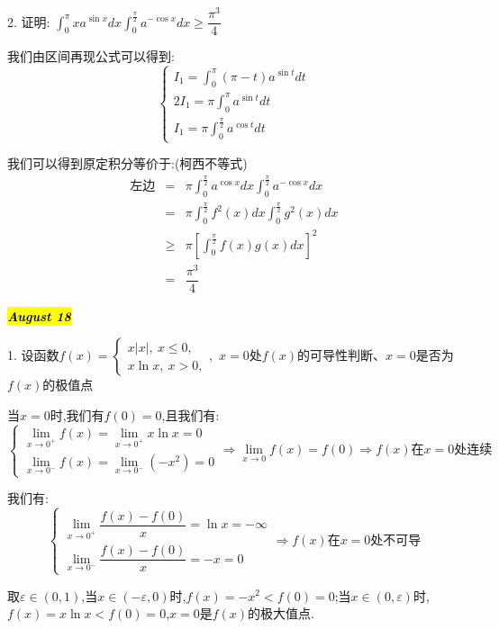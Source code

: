 2. 证明:  $\int_{0}^{\pi}xa^{\sin x}dx\int_{0}^{\frac{\pi}{2}}a^{-\cos x}dx\geq \dfrac{\pi^3}{4}$
\begin{solution}

	我们由区间再现公式可以得到:
	$$\left\lbrace 
	\begin{array}{l}
		I_{1}=\int_{0}^{\pi}(\pi-t)a^{\sin t}dt\\
		2I_{1}=\pi\int_{0}^{\pi}a^{\sin t}dt\\
		I_{1}=\pi\int_{0}^{\frac{\pi}{2}}a^{\cos t}dt
	\end{array}
	\right. $$
	
	我们可以得到原定积分等价于:(柯西不等式)
	\begin{eqnarray*}
		\text{左边}&=&\pi\int_{0}^{\frac{\pi}{2}}a^{\cos x}dx\int_{0}^{\frac{\pi}{2}}a^{-\cos x}dx\\
		&=&\pi\int_{0}^{\frac{\pi}{2}}f^{2}(x)dx\int_{0}^{\frac{\pi}{2}}g^{2}(x)dx\\
		&\geq &\pi \left[ \int_{0}^{\frac{\pi}{2}}f(x)g(x)dx\right]^2\\
		&=&\dfrac{\pi^3}{4} 
	\end{eqnarray*}
\end{solution}

\hl{\textbf{\textit{August 18}}}

1. 设函数$f(x)=\left\lbrace
\begin{array}{l}
	x|x|,\ x\leq 0,\\
	x\ln x,\ x>0,
\end{array}
\right. $,\ $x=0$处$f(x)$的可导性判断、$x=0$是否为$f(x)$的极值点
\begin{solution}

	当$x=0$时,我们有$f(0)=0$,且我们有:  
	$$\left\lbrace
	\begin{array}{l}
		\lim\limits_{x\rightarrow 0^{+}}f(x)=\lim\limits_{x\rightarrow 0^{+}}x\ln x=0\\
		\lim\limits_{x\rightarrow 0^{-}}f(x)=\lim\limits_{x\rightarrow 0^{-}}(-x^2)=0
	\end{array}
	\right. \Rightarrow \lim\limits_{x\rightarrow 0}f(x)=f(0)\Rightarrow f(x)\text{在}x=0\text{处连续}$$
	
	我们有:  
	$$\left\lbrace
	\begin{array}{l}
		\lim\limits_{x\rightarrow 0^{+}}\dfrac{f(x)-f(0)}{x}=\ln x=-\infty\\
		\lim\limits_{x\rightarrow 0^{-}}\dfrac{f(x)-f(0)}{x}=-x=0
	\end{array}
	\right. \Rightarrow f(x)\text{在}x=0\text{处不可导}$$
	
	取$\varepsilon\in(0,1)$,当$x\in(-\varepsilon,0)$时,$f(x)=-x^2<f(0)=0$;当$x\in(0,\varepsilon)$时,$f(x)=x\ln x<f(0)=0$,$x=0$是$f(x)$的极大值点.
\end{solution}

